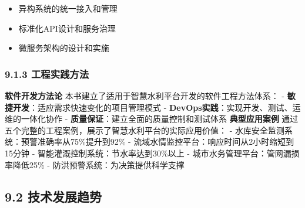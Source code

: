 {\begin{enumerate}
\begin{itemize}
\tightlist \item 异构系统的统一接入和管理 \item 标准化API设计和服务治理 \item 微服务架构的设计和实施 \end{itemize} \end{enumerate} \subsubsection{9.1.3
工程实践方法}\label{ux5de5ux7a0bux5b9eux8df5ux65b9ux6cd5} \textbf{软件开发方法论} 本书建立了适用于智慧水利平台开发的软件工程方法体系： -
\textbf{敏捷开发}：适应需求快速变化的项目管理模式 - \textbf{DevOps实践}：实现开发、测试、运维的一体化协作 - \textbf{质量保证}：建立全面的质量控制和测试体系 \textbf{典型应用案例}
通过五个完整的工程案例，展示了智慧水利平台的实际应用价值： - 水库安全监测系统：预警准确率从75\%提升到92\% - 流域水情监控平台：响应时间从2小时缩短到15分钟 - 智能灌溉控制系统：节水率达到30\%以上 -
城市水务管理平台：管网漏损率降低25\% - 防洪预警系统：为决策提供科学支撑 \subsection{9.2 技术发展趋势}\label{ux6280ux672fux53d1ux5c55ux8d8bux52bf}
}
